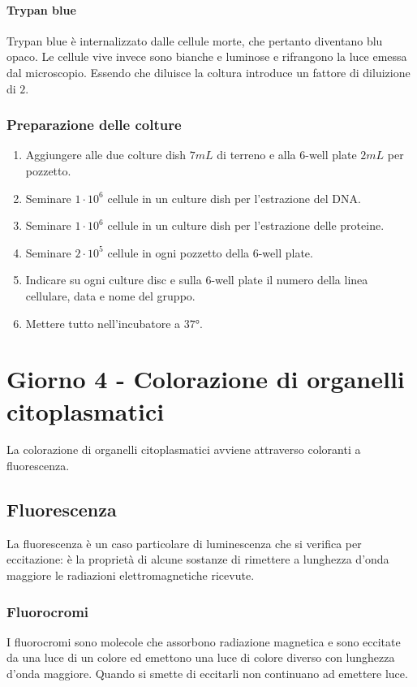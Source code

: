 			\paragraph{Trypan blue}
			Trypan blue \`e internalizzato dalle cellule morte, che pertanto diventano blu opaco. 
			Le cellule vive invece sono bianche e luminose e rifrangono la luce emessa dal microscopio.
			Essendo che diluisce la coltura introduce un fattore di diluizione di $2$.
		
		\subsubsection{Preparazione delle colture}
		\begin{multicols}{2}
		\begin{enumerate}
			\item Aggiungere alle due colture dish $7\si{mL}$ di terreno e alla $6$-well plate $2\si{mL}$ per pozzetto.
			\item Seminare $1\cdot 10^6$ cellule in un culture dish per l'estrazione del DNA.
			\item Seminare $1\cdot 10^6$ cellule in un culture dish per l'estrazione delle proteine.
			\item Seminare $2\cdot 10^5$ cellule in ogni pozzetto della $6$-well plate.
			\item Indicare su ogni culture disc e sulla $6$-well plate il numero della linea cellulare, data e nome del gruppo.
			\item Mettere tutto nell'incubatore a $37\si{\degree}$.
		\end{enumerate}
			\end{multicols}




\section{Giorno 4 - Colorazione di organelli citoplasmatici}
La colorazione di organelli citoplasmatici avviene attraverso coloranti a fluorescenza.

	\subsection{Fluorescenza}
	La fluorescenza \`e un caso particolare di luminescenza che si verifica per eccitazione: \`e la propriet\`a di alcune sostanze di rimettere a lunghezza d'onda maggiore le radiazioni elettromagnetiche ricevute.

		\subsubsection{Fluorocromi}
		I fluorocromi sono molecole che assorbono radiazione magnetica e sono eccitate da una luce di un colore ed emettono una luce di colore diverso con lunghezza d'onda maggiore.
		Quando si smette di eccitarli non continuano ad emettere luce.

